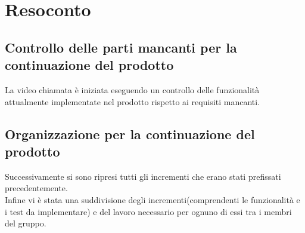 \section{Resoconto}
\subsection{Controllo delle parti mancanti per la continuazione del prodotto}
La video chiamata è iniziata eseguendo un controllo delle funzionalità attualmente implementate nel prodotto rispetto ai requisiti mancanti.\\
\subsection{Organizzazione per la continuazione del prodotto}
Successivamente si sono ripresi tutti gli incrementi che erano stati prefissati precedentemente.\\
Infine vi è stata una suddivisione degli incrementi(comprendenti le funzionalità e i test da implementare) e del lavoro necessario per ognuno di essi tra i membri del gruppo.
